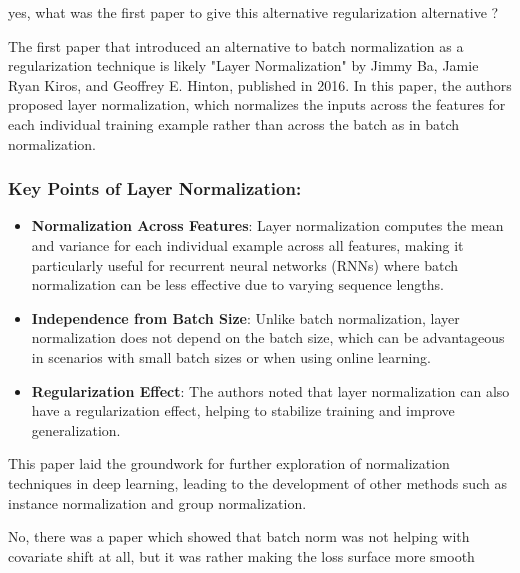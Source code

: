 \begin{userprompt}

yes, what was the first paper to give this alternative regularization alternative ?

\end{userprompt}

\begin{botresponse}

The first paper that introduced an alternative to batch normalization as a regularization technique is likely "Layer Normalization" by Jimmy Ba, Jamie Ryan Kiros, and Geoffrey E. Hinton, published in 2016. In this paper, the authors proposed layer normalization, which normalizes the inputs across the features for each individual training example rather than across the batch as in batch normalization.

\subsubsection{Key Points of Layer Normalization:}

\begin{itemize}
\item \textbf{Normalization Across Features}: Layer normalization computes the mean and variance for each individual example across all features, making it particularly useful for recurrent neural networks (RNNs) where batch normalization can be less effective due to varying sequence lengths.
\item \textbf{Independence from Batch Size}: Unlike batch normalization, layer normalization does not depend on the batch size, which can be advantageous in scenarios with small batch sizes or when using online learning.
\item \textbf{Regularization Effect}: The authors noted that layer normalization can also have a regularization effect, helping to stabilize training and improve generalization.
\end{itemize}

This paper laid the groundwork for further exploration of normalization techniques in deep learning, leading to the development of other methods such as instance normalization and group normalization.

\end{botresponse}

\begin{userprompt}

No, there was a paper which showed that batch norm was not helping with covariate shift at all, but it was rather making the loss surface more smooth

\end{userprompt}

